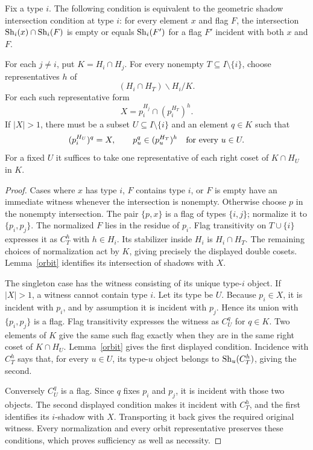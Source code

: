\begin{theorem}\label{shadowtest}
Fix a type $i$. The following condition is equivalent to the geometric
shadow intersection condition at type $i$: for every element $x$ and flag
$F$, the intersection $\operatorname{Sh}_i(x)\cap\operatorname{Sh}_i(F)$ is empty or equals
$\operatorname{Sh}_i(F')$ for a flag $F'$ incident with both $x$ and $F$.

For each $j\ne i$, put $K=H_i\cap H_j$. For every nonempty
$T\subseteq I\setminus\{i\}$, choose representatives $h$ of
\[
                  (H_i\cap H_T)\backslash H_i/K.
\]
For each such representative form
\[
                  X=p_i^{H_j}\cap(p_i^{H_T})^h.
\]
If $|X|>1$, there must be a subset $U\subseteq I\setminus\{i\}$
and an element $q\in K$ such that
\[
 (p_i^{H_U})^q=X,
 \qquad p_u^q\in(p_u^{H_T})^h\quad\hbox{for every }u\in U.
\]
For a fixed $U$ it suffices to take one representative of each right
coset of $K\cap H_U$ in $K$.
\end{theorem}
\begin{proof}
Cases where $x$ has type $i$, $F$ contains type $i$, or $F$ is empty have
an immediate witness whenever the intersection is nonempty. Otherwise
choose $p$ in the nonempty intersection. The pair $\{p,x\}$ is a flag of
types $\{i,j\}$; normalize it to $\{p_i,p_j\}$. The normalized $F$ lies
in the residue of $p_i$. Flag transitivity on $T\cup\{i\}$ expresses it
as $C_T^h$ with $h\in H_i$. Its stabilizer inside $H_i$ is $H_i\cap H_T$.
The remaining choices of normalization act by $K$, giving precisely the
displayed double cosets. Lemma~\ref{orbit} identifies its intersection
of shadows with $X$.

The singleton case has the witness consisting of its unique type-$i$
object. If $|X|>1$, a witness cannot contain type $i$. Let its type be
$U$. Because $p_i\in X$, it is incident with $p_i$, and by assumption it
is incident with $p_j$. Hence its union with $\{p_i,p_j\}$ is a flag.
Flag transitivity expresses the witness as $C_U^q$ for $q\in K$.
Two elements of $K$ give the same such flag exactly when they are in
the same right coset of $K\cap H_U$. Lemma~\ref{orbit} gives the first
displayed condition. Incidence with $C_T^h$ says that, for every $u\in U$,
its type-$u$ object belongs to $\operatorname{Sh}_u(C_T^h)$, giving the second.

Conversely $C_U^q$ is a flag. Since $q$ fixes $p_i$ and $p_j$, it is
incident with those two objects. The second displayed condition makes
it incident with $C_T^h$, and the first identifies its $i$-shadow with
$X$. Transporting it back gives the required original witness. Every
normalization and every orbit representative preserves these conditions,
which proves sufficiency as well as necessity.
\end{proof}

